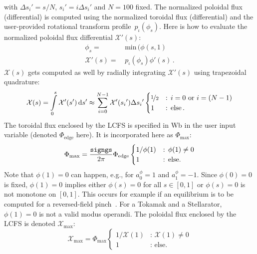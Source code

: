 with $\Delta {s_i}' = s/N$, ${s_i}' = i \Delta {s_i}'$ and $N=100$ fixed.
The normalized poloidal flux (differential) is computed using the normalized toroidal flux (differential) and the user-provided rotational transform profile~$p_\iota(\phi_s)$.
Here is how to evaluate the normalized poloidal flux differential $\mathcal{X}'(s)$:
\begin{align}
           \phi_s =&\, \mathrm{min}\,(\phi(s, 1) \\
  \mathcal{X}'(s) =&\, p_\iota(\phi_s) {\phi'}(s) \, .
\end{align}
$\mathcal{X}(s)$ gets computed as well by radially integrating ${\mathcal{X}'}(s)$ using trapezoidal quadrature:
\begin{equation}
  \mathcal{X}(s) = \int\limits_0^s {\mathcal{X}'}(s') \,\mathrm{d}s'
    \approx \sum\limits_{i=0}^{N-1} {\mathcal{X}'}({s_i}') \Delta {s_i}' \begin{cases}
                                                                    \nicefrac{1}{2} &\textrm{: } i=0 \textrm{ or } i=(N-1) \\
                                                                    1     &\textrm{: else} \, .
                                                                  \end{cases}
\end{equation}
The toroidal flux enclosed by the LCFS is specified in Wb in the user input variable  (denoted $\Phi_\mathrm{edge}$ here).
It is incorporated here as $\Phi_\mathrm{max}$:
\begin{equation}
  \Phi_\mathrm{max} = \frac{\texttt{signgs}}{2 \pi} \Phi_\mathrm{edge}
    \begin{cases}
      1/\phi(1) &\textrm{: } \phi(1) \neq 0 \\
      1         &\textrm{: else.}
    \end{cases}
\end{equation}
Note that $\phi(1)=0$ can happen, e.g., for $a^\phi_0=1$ and $a^\phi_1 = -1$.
Since $\phi(0)=0$ is fixed, $\phi(1)=0$ implies either $\phi(s)=0$ for all $s\in[0,1]$
or $\phi(s)=0$ is not monotone on $[0,1]$.
This occurs for example if an equilibrium is to be computed for a reversed-field pinch~\cite{2010_terranova, 2011_momo}.
For a Tokamak and a Stellarator, $\phi(1)=0$ is not a valid modus operandi.
The poloidal flux enclosed by the LCFS is denoted $\mathcal{X}_\mathrm{max}$:
\begin{equation}
  \mathcal{X}_\mathrm{max} = \Phi_\mathrm{max}
    \begin{cases}
      1/\mathcal{X}(1) &\textrm{: } \mathcal{X}(1) \neq 0 \\
      1                &\textrm{: else.}
    \end{cases}
\end{equation}
